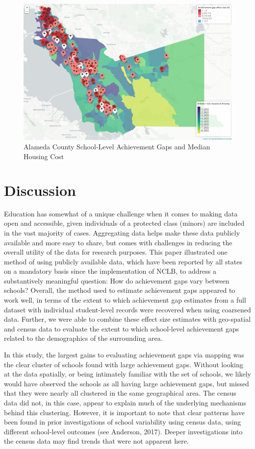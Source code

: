 \documentclass[man, fleqn, noextraspace]{apa6}
\theoremstyle{definition}
\theoremstyle{definition}
\theoremstyle{definition}
\theoremstyle{remark}
\begin{document}
\begin{figure}
\centering
\includegraphics{anderson_ncme18_files/screen_caps/poverty.png}
\caption{Alameda County School-Level Achievement Gaps and Median Housing
Cost}
\end{figure}

\hypertarget{discussion}{%
\section{Discussion}\label{discussion}}

Education has somewhat of a unique challenge when it comes to making
data open and accessible, given individuals of a protected class
(minors) are included in the vast majority of cases. Aggregating data
helps make these data publicly available and more easy to share, but
comes with challenges in reducing the overall utility of the data for
research purposes. This paper illustrated one method of using publicly
available data, which have been reported by all states on a mandatory
basis since the implementation of NCLB, to address a substantively
meaningful question: How do achievement gaps vary between schools?
Overall, the method used to estimate achievement gaps appeared to work
well, in terms of the extent to which achievement gap estimates from a
full dataset with individual student-level records were recovered when
using coarsened data. Further, we were able to combine these effect size
estimates with geo-spatial and census data to evaluate the extent to
which school-level achievement gaps related to the demographics of the
surrounding area.

In this study, the largest gains to evaluating achievement gaps via
mapping was the clear cluster of schools found with large achievement
gaps. Without looking at the data spatially, or being intimately
familiar with the set of schools, we likely would have observed the
schools as all having large achievement gaps, but missed that they were
nearly all clustered in the same geographical area. The census data did
not, in this case, appear to explain much of the underlying mechanisms
behind this clustering. However, it is important to note that clear
patterns have been found in prior investigations of school variability
using census data, using different school-level outcomes (see Anderson,
2017). Deeper investigations into the census data may find trends that
were not apparent here.
\end{document}
